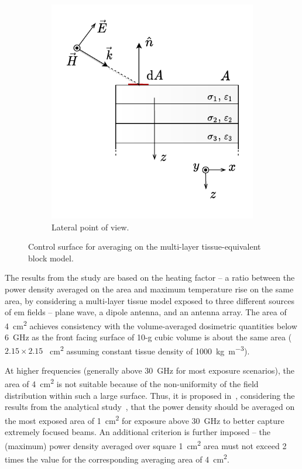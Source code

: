 \begin{figure}[ht]
\begin{subfigure}[b]{0.42\textwidth}
        \includegraphics[width=\linewidth]{artwork/averaging_surface.b.pdf}
        \caption{Lateral point of view.}
        \label{fig:averaging_surface_b}
        \end{subfigure}
    
    \caption{Control surface for averaging on the multi-layer tissue-equivalent block model.}
    \label{fig:averaging_surface}
\end{figure}
The results from the study are based on the heating factor -- a ratio between the power density averaged on the area and maximum temperature rise on the same area, by considering a multi-layer tissue model exposed to three different sources of \gls{em} fields -- plane wave, a dipole antenna, and an antenna array.
The area of \SI{4}{\cm\squared} achieves consistency with the volume-averaged dosimetric quantities below \SI{6}{\GHz} as the front facing surface of 10-g cubic volume is about the same area ($2.15 \times 2.15$ \SI{}{\cm\squared} assuming constant tissue density of \SI{1000}{\kg\per\m\cubed}).

At higher frequencies (generally above \SI{30}{\GHz} for most exposure scenarios), the area of \SI{4}{\cm\squared} is not suitable because of the non-uniformity of the field distribution within such a large surface.
Thus, it is proposed in~\cite{Hashimoto2017On}, considering the results from the analytical study~\cite{Foster2016Thermal}, that the power density should be averaged on the most exposed area of \SI{1}{\cm\squared} for exposure above \SI{30}{\GHz} to better capture extremely focused beams.
An additional criterion is further imposed -- the (maximum) power density averaged over square \SI{1}{\cm\squared} area must not exceed 2 times the value for the corresponding averaging area of \SI{4}{\cm\squared}.

